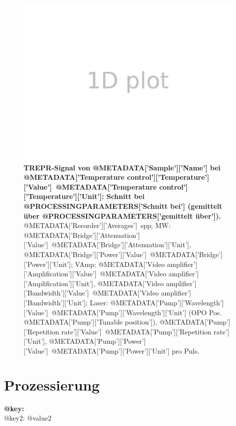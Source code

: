 \documentclass{article}
\begin{document}
\begin{figure}[H]
	\includegraphics[width=\textwidth]{Plotter1D}
\caption{\textbf{TREPR-Signal von {@METADATA['Sample']['Name']} bei {@METADATA['Temperature control']['Temperature']['Value']}~{@METADATA['Temperature control']['Temperature']['Unit']}: Schnitt bei {@PROCESSINGPARAMETERS['Schnitt bei']} (gemittelt über {@PROCESSINGPARAMETERS['gemittelt über']}).} {@METADATA['Recorder']['Averages']}~spp; MW: {@METADATA['Bridge']['Attenuation']['Value']}~{@METADATA['Bridge']['Attenuation']['Unit']}, {@METADATA['Bridge']['Power']['Value']}~{@METADATA['Bridge']['Power']['Unit']}; VAmp: {@METADATA['Video amplifier']['Amplification']['Value']}~{@METADATA['Video amplifier']['Amplification']['Unit']}, {@METADATA['Video amplifier']['Bandwidth']['Value']}~{@METADATA['Video amplifier']['Bandwidth']['Unit']}; Laser: {@METADATA['Pump']['Wavelength']['Value']}~{@METADATA['Pump']['Wavelength']['Unit']} (OPO Pos. {@METADATA['Pump']['Tunable position']}), {@METADATA['Pump']['Repetition rate']['Value']}~{@METADATA['Pump']['Repetition rate']['Unit']}, {@METADATA['Pump']['Power']['Value']}~{@METADATA['Pump']['Power']['Unit']} pro Puls.}  
\end{figure}

\section*{Prozessierung}

	\textbf{{@key}:}
	\\
		{@key2}: {@value2}
		\\
\end{document}
